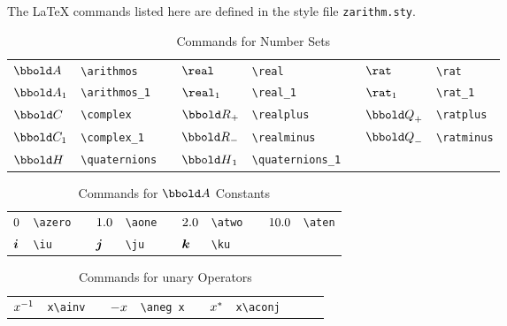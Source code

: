 \documentclass[12pt]{article}
\begin{document}
The \LaTeX{} commands listed here are defined in the style file
\verb|zarithm.sty|.

\begin{table}[htbp]
  \centering
  \begin{tabular}{llp{1cm}llp{1cm}ll}
    $\arithmos$    & \verb|\arithmos| && $\real$ & \verb|\real|&& $\rat$ & \verb|\rat| \\
    $\arithmos_1$  & \verb|\arithmos_1| && $\real_1$ & \verb|\real_1| && $\rat_1$ & \verb|\rat_1| \\
    $\complex$ & \verb|\complex| &&  $\realplus$ & \verb|\realplus| && $\ratplus$ & \verb|\ratplus| \\ 
    $\complex_1$ & \verb|\complex_1| && $\realminus$ &
                                                       \verb|\realminus| && $\ratminus$ & \verb|\ratminus| \\
    $\quaternions$ & \verb|\quaternions| && $\quaternions_1$ & \verb|\quaternions_1| && &    \\
  \end{tabular}
  \caption{Commands for Number Sets}
  \label{tab:latex-number-sets}
\end{table}
%
\begin{table}[htbp]
  \centering
  \begin{tabular}{llp{1cm}llp{1cm}llp{1cm}ll}
    $0$    & \verb|\azero| && $1.0$  & \verb|\aone| && $2.0$  &
                                                                \verb|\atwo| && $10.0$ & \verb|\aten| \\
    $\bm{i}$  & \verb|\iu| && $\bm{j}$ & \verb|\ju| && $\bm{k}$ & \verb|\ku| && & \\
  \end{tabular}
  \caption{Commands for $\arithmos$ Constants}
  \label{tab:latex-constants}
\end{table}
%
\begin{table}[htbp]
  \centering
  \begin{tabular}{llp{1cm}llp{1cm}llp{1cm}ll}
       $x^{-1}$    & \verb|x\ainv| &&  $- x$  & \verb|\aneg x| &&
                                                                      $x^{*}$
    & \verb|x\aconj|\\
  \end{tabular}
  \caption{Commands for unary Operators}
  \label{tab:latex-unary-operators}
\end{table}
%
\end{document}
